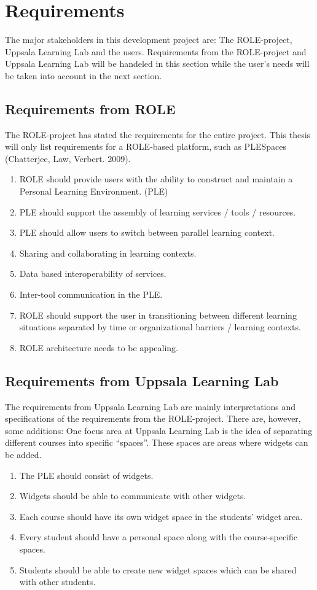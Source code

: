 \section {Requirements}
The major stakeholders in this development project are: The ROLE-project, Uppsala Learning Lab and the users. Requirements from the ROLE-project and Uppsala Learning Lab will be handeled in this section while the user's needs will be taken into account in the next section.

\subsection {Requirements from ROLE}
The ROLE-project has stated the requirements for the entire project. This thesis will only list requirements for a ROLE-based platform, such as PLESpaces (Chatterjee, Law,  Verbert. 2009).

\begin {enumerate}
	\item ROLE should provide users with the ability to construct and maintain a Personal Learning Environment. (PLE)
	\item PLE should support the assembly of learning services / tools / resources.
	\item PLE should allow users to switch between parallel learning context.
	\item Sharing and collaborating in learning contexts.
	\item Data based interoperability of services.
	\item Inter-tool communication in the PLE.
	\item ROLE should support the user in transitioning between different learning situations separated by time or organizational barriers / learning contexts. 
	\item ROLE architecture needs to be appealing.
\end {enumerate}

\subsection {Requirements from Uppsala Learning Lab}
The requirements from Uppsala Learning Lab are mainly interpretations and specifications of the requirements from the ROLE-project. There are, however, some additions: One focus area at Uppsala Learning Lab is the idea of separating different courses into specific “spaces”. These spaces are areas where widgets can be added.

\begin {enumerate}
	\item The PLE should consist of widgets.
	\item Widgets should be able to communicate with other widgets.
	\item Each course should have its own widget space in the students' widget area.
	\item Every student should have a personal space along with the course-specific spaces.
	\item Students should be able to create new widget spaces which can be shared with other students.
\end {enumerate}
